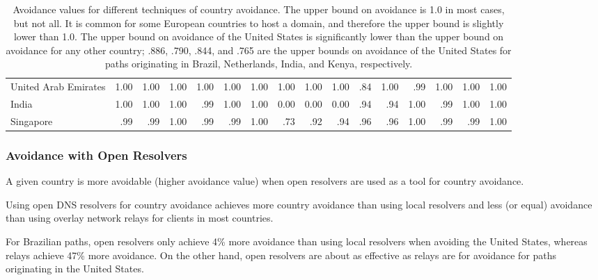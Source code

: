 \begin{table*}[t]
{\begin{tabular}{P{32mm}|d{3.2}d{3.2}d{3.2}|d{3.2}d{3.2}d{3.2}|d{3.2}d{3.2}d{3.2}|d{3.2}d{3.2}d{3.2}|d{3.2}d{3.2}d{3.2}}
United Arab Emirates &1.00  &1.00   &1.00     &1.00 &1.00 &1.00   &1.00 &1.00   &1.00  &.84 &1.00  &.99  &1.00 &1.00 &1.00  \\
India                &1.00  &1.00   &1.00     &.99 &1.00 &1.00   &0.00 &0.00   &0.00  &.94 &.94  &1.00  &.99 &1.00 &1.00  \\
Singapore            &.99  &.99   &1.00     &.99 &.99 &1.00   &.73  &.92  &.94  &.96 &.96  &1.00  &.99 &.99 &1.00  \\\midrule
\end{tabular}
}
\caption{Avoidance values for different techniques of country avoidance.  The upper bound on avoidance is 1.0 in most cases, but not all.  It is 
common for some European countries to host a domain, and therefore the upper bound is slightly lower than 1.0.  The upper bound on avoidance of the 
United States is significantly lower than the upper bound on avoidance for any other country; .886, .790, .844, and .765 are the upper bounds on avoidance 
of the United States for paths originating in Brazil, Netherlands, India, and Kenya, respectively.}
\label{tab:avoid}
\end{table*}

\subsubsection{Avoidance with Open Resolvers}

A given country is more avoidable (higher avoidance value) when open
resolvers are used as a tool for country avoidance. 

\begin{finding}
Using open DNS resolvers for country avoidance achieves more country
avoidance than using local resolvers and less (or equal)
avoidance than using overlay network relays for clients in most
countries. 
\end{finding}
\noindent
For Brazilian paths, open resolvers only achieve 4\% more avoidance than
using local resolvers when avoiding the United States, whereas relays
achieve 47\% more avoidance.  On the other hand, open resolvers are
about as effective as relays are for avoidance for paths originating in
the United States.   

